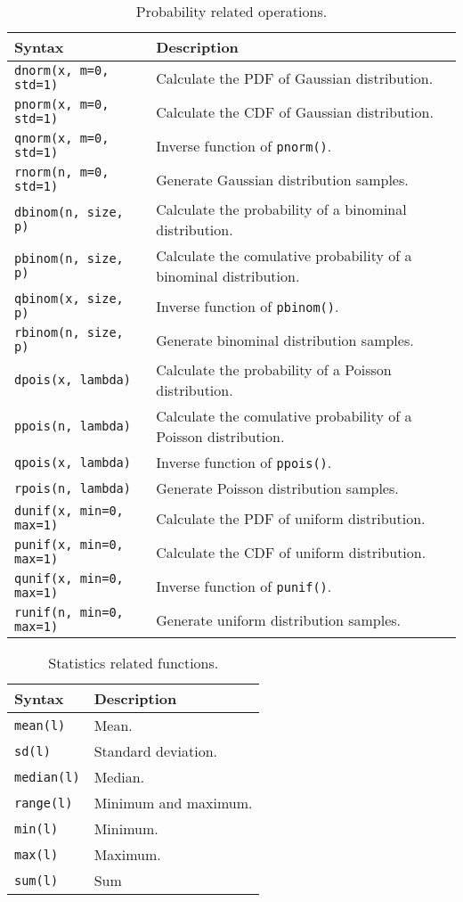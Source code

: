 \begin{table}
	\centering \caption{Probability related operations.}\label{ch:r1:tab:probabilityfunction}
	\begin{tabularx}{\textwidth}{lX}
		\hline
		Syntax & Description \\ \hline
		\verb|dnorm(x, m=0, std=1)| & Calculate the PDF of Gaussian distribution. \\
		\verb|pnorm(x, m=0, std=1)| & Calculate the CDF of Gaussian distribution. \\
		\verb|qnorm(x, m=0, std=1)| & Inverse function of \verb|pnorm()|. \\
		\verb|rnorm(n, m=0, std=1)| & Generate Gaussian distribution samples. \\
		\verb|dbinom(n, size, p)| & Calculate the probability of a binominal distribution. \\
		\verb|pbinom(n, size, p)| & Calculate the comulative probability of a binominal distribution. \\
		\verb|qbinom(x, size, p)| & Inverse function of \verb|pbinom()|. \\
		\verb|rbinom(n, size, p)| & Generate binominal distribution samples. \\
		\verb|dpois(x, lambda)| & Calculate the probability of a Poisson distribution. \\
		\verb|ppois(n, lambda)| & Calculate the comulative probability of a Poisson distribution. \\
		\verb|qpois(x, lambda)| & Inverse function of \verb|ppois()|. \\
		\verb|rpois(n, lambda)| & Generate Poisson distribution samples. \\
		\verb|dunif(x, min=0, max=1)| & Calculate the PDF of uniform distribution. \\
		\verb|punif(x, min=0, max=1)| & Calculate the CDF of uniform distribution. \\
		\verb|qunif(x, min=0, max=1)| & Inverse function of \verb|punif()|. \\
		\verb|runif(n, min=0, max=1)| & Generate uniform distribution samples. \\
		\hline
	\end{tabularx}
\end{table}

\begin{table}
	\centering \caption{Statistics related functions.}\label{ch:r1:tab:statisticsfunction}
	\begin{tabularx}{\textwidth}{lX}
		\hline
		Syntax & Description \\ \hline
		\verb|mean(l)| & Mean. \\
		\verb|sd(l)| & Standard deviation. \\
		\verb|median(l)| & Median. \\
		\verb|range(l)| & Minimum and maximum. \\
		\verb|min(l)| & Minimum. \\
		\verb|max(l)| & Maximum. \\
		\verb|sum(l)| & Sum \\
		\hline
	\end{tabularx}
\end{table}

